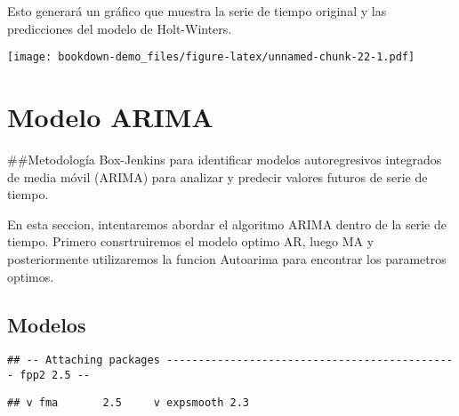 \documentclass[
]{book}
\newenvironment{Shaded}{\begin{snugshade}}{\end{snugshade}}
\newcommand{\AttributeTok}[1]{\textcolor[rgb]{0.77,0.63,0.00}{#1}}
\newcommand{\DecValTok}[1]{\textcolor[rgb]{0.00,0.00,0.81}{#1}}
\newcommand{\FunctionTok}[1]{\textcolor[rgb]{0.00,0.00,0.00}{#1}}
\newcommand{\NormalTok}[1]{#1}
\newcommand{\SpecialCharTok}[1]{\textcolor[rgb]{0.00,0.00,0.00}{#1}}
\newcommand{\StringTok}[1]{\textcolor[rgb]{0.31,0.60,0.02}{#1}}
\begin{document}
Esto generará un gráfico que muestra la serie de tiempo original y las predicciones del modelo de Holt-Winters.

\begin{Shaded}
\end{Shaded}

\texttt{[image: bookdown-demo\_files/figure-latex/unnamed-chunk-22-1.pdf]}

\hypertarget{modelo-arima}{%
\chapter{Modelo ARIMA}\label{modelo-arima}}

\#\#Metodología Box-Jenkins para identificar modelos autoregresivos integrados de media móvil (ARIMA) para analizar y predecir valores futuros de serie de tiempo.

En esta seccion, intentaremos abordar el algoritmo ARIMA dentro de la serie de tiempo. Primero consrtruiremos el modelo optimo AR, luego MA y posteriormente utilizaremos la funcion Autoarima para encontrar los parametros optimos.

\hypertarget{modelos}{%
\section{Modelos}\label{modelos}}

\begin{verbatim}
## -- Attaching packages ---------------------------------------------- fpp2 2.5 --
\end{verbatim}

\begin{verbatim}
## v fma       2.5     v expsmooth 2.3
\end{verbatim}
\end{document}
